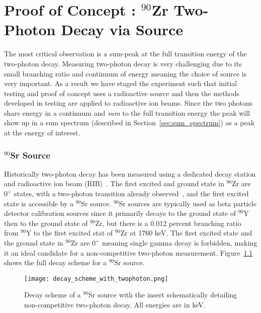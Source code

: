 \documentclass[cnatzke_thesis_proposal.tex]{subfiles}
\begin{document}
\chapter{Proof of Concept : $^{90}$Zr Two-Photon Decay via Source}
\label{sec:proof_of_concept_90sr}


The most critical observation is a sum-peak at the full transition energy of the two-photon decay. 
Measuring two-photon decay is very challenging due to its small branching ratio and continuum of energy meaning the choice of source is very important.
As a result we have staged the experiment such that initial testing and proof of concept uses a radioactive source and then the methods developed in testing are applied to radioactive ion beams. 
Since the two photons share energy in a continuum and \textit{sum} to the full transition energy the peak will show up in a sum spectrum (described in Section~\ref{sec:sum_spectrum}) as a peak at the energy of interest.

\subsection{$^{90}$Sr Source}
Historically two-photon decay has been measured using a dedicated decay station and radioactive ion beam (RIB)~\cite{kramp_nuclear_1987}.
The first excited and ground state in $^{90}$Zr are $0^+$ states, with a two-photon transition already observed~\cite{schirmer_double_1984}, and the first excited state is accessible by a $^{90}$Sr source.
$^{90}$Sr sources are typically used as beta particle detector calibration sources since it primarily decays to the ground state of $^{90}$Y then to the ground state of $^{90}$Zr, but there is a 0.012 percent branching ratio from $^{90}$Y to the first excited stat of $^{90}$Zr at 1760 keV.
The first excited state and the ground state in $^{90}$Zr are $0^+$ meaning single gamma decay is forbidden, making it an ideal candidate for a non-competitive two-photon measurement.
Figure~\ref{fig:decay_scheme_with_twophoton} shows the full decay scheme for a $^{90}$Sr source.

\begin{figure}[H]
  \centering
  \texttt{[image: decay\_scheme\_with\_twophoton.png]}
  \caption{Decay scheme of a $^{90}$Sr source with the insert schematically detailing non-competitive two-photon decay. All energies are in keV.}
  \label{fig:decay_scheme_with_twophoton}
\end{figure}
\end{document}
